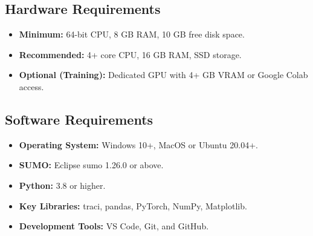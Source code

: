 \subsection{Hardware Requirements}
\label{subsec:hardware_requirements}
\begin{itemize}
    \item \textbf{Minimum:} 64-bit CPU, 8 GB RAM, 10 GB free disk space.
    \item \textbf{Recommended:} 4+ core CPU, 16 GB RAM, SSD storage.
    \item \textbf{Optional (Training):} Dedicated GPU with 4+ GB VRAM or Google Colab access.
\end{itemize}

\subsection{Software Requirements}
\label{subsec:software_requirements}
\begin{itemize}
    \item \textbf{Operating System:} Windows 10+, MacOS or Ubuntu 20.04+.
    \item \textbf{SUMO:} Eclipse \gls{sumo} 1.26.0 or above.
    \item \textbf{Python:} 3.8 or higher.
    \item \textbf{Key Libraries:} \gls{traci}, pandas, PyTorch, NumPy, Matplotlib.
    \item \textbf{Development Tools:} VS Code, Git, and GitHub.
\end{itemize}
